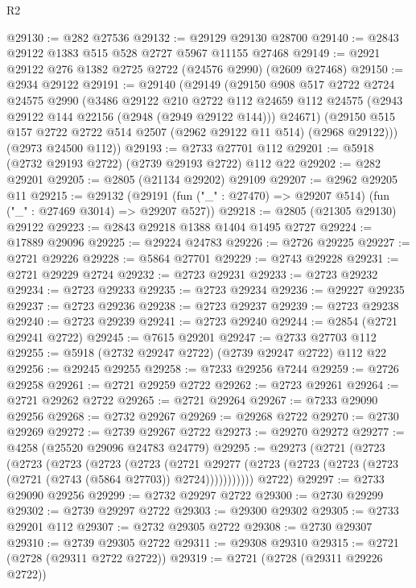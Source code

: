 \begin{lexlean}{R2}
\begin{coremodule}
@29130 := @282 @27536
@29132 := @29129 @29130 @28700
@29140 := @2843 @29122 @1383 @515 @528 @2727 @5967 @11155 @27468
@29149 := @2921 @29122 @276 @1382 @2725 @2722 (@24576 @2990) (@2609 @27468)
@29150 := @2934 @29122
@29191 := @29140
    (@29149
      (@29150
        @908
        @517
        @2722
        @2724
        @24575
        @2990
        (@3486
          @29122
          @210
          @2722
          @112
          @24659
          @112
          @24575
          (@2943 @29122 @144 @22156 (@2948 (@2949 @29122 @144)))
          @24671)
        (@29150 @515 @157 @2722 @2722 @514 @2507 (@2962 @29122 @11 @514) (@2968 @29122)))
      (@2973 @24500 @112))
@29193 := @2733 @27701 @112
@29201 := @5918 (@2732 @29193 @2722) (@2739 @29193 @2722) @112 @22
@29202 := @282 @29201
@29205 := @2805 (@21134 @29202) @29109
@29207 := @2962 @29205 @11
@29215 := @29132
    (@29191 (fun ("_" : @27470) => @29207 @514) (fun ("_" : @27469 @3014) => @29207 @527))
@29218 := @2805 (@21305 @29130) @29122
@29223 := @2843 @29218 @1388 @1404 @1495 @2727
@29224 := @17889 @29096
@29225 := @29224 @24783
@29226 := @2726 @29225
@29227 := @2721 @29226
@29228 := @5864 @27701
@29229 := @2743 @29228
@29231 := @2721 @29229 @2724
@29232 := @2723 @29231
@29233 := @2723 @29232
@29234 := @2723 @29233
@29235 := @2723 @29234
@29236 := @29227 @29235
@29237 := @2723 @29236
@29238 := @2723 @29237
@29239 := @2723 @29238
@29240 := @2723 @29239
@29241 := @2723 @29240
@29244 := @2854 (@2721 @29241 @2722)
@29245 := @7615 @29201
@29247 := @2733 @27703 @112
@29255 := @5918 (@2732 @29247 @2722) (@2739 @29247 @2722) @112 @22
@29256 := @29245 @29255
@29258 := @7233 @29256 @7244
@29259 := @2726 @29258
@29261 := @2721 @29259 @2722
@29262 := @2723 @29261
@29264 := @2721 @29262 @2722
@29265 := @2721 @29264
@29267 := @7233 @29090 @29256
@29268 := @2732 @29267
@29269 := @29268 @2722
@29270 := @2730 @29269
@29272 := @2739 @29267 @2722
@29273 := @29270 @29272
@29277 := @4258 (@25520 @29096 @24783 @24779)
@29295 := @29273
    (@2721
      (@2723
        (@2723
          (@2723
            (@2723
              (@2723
                (@2721
                  @29277
                  (@2723 (@2723 (@2723 (@2723 (@2721 (@2743 (@5864 @27703)) @2724)))))))))))
      @2722)
@29297 := @2733 @29090 @29256
@29299 := @2732 @29297 @2722
@29300 := @2730 @29299
@29302 := @2739 @29297 @2722
@29303 := @29300 @29302
@29305 := @2733 @29201 @112
@29307 := @2732 @29305 @2722
@29308 := @2730 @29307
@29310 := @2739 @29305 @2722
@29311 := @29308 @29310
@29315 := @2721 (@2728 (@29311 @2722 @2722))
@29319 := @2721 (@2728 (@29311 @29226 @2722))

\end{coremodule}
\end{lexlean}
